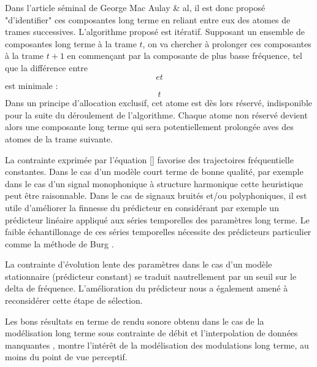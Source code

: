 Dans l'article séminal de George Mac Aulay \& al, il est donc proposé "d'identifier" ces composantes long terme en reliant entre eux des atomes de trames successives. L'algorithme proposé est itératif. Supposant un ensemble de composantes long terme à la trame $t$, on va chercher à prolonger ces composantes à la trame $t+1$ en commençant par la composante de plus basse fréquence, tel que la différence entre $$ et $$ est minimale :
\begin{equation}
t
\end{equation}
Dans un principe d'allocation exclusif, cet atome est dès lors réservé, indisponible pour la suite du déroulement de l'algorithme. Chaque atome non réservé devient alors une composante long terme qui sera potentiellement prolongée aves des atomes de la trame suivante.

La contrainte exprimée par l'équation \ref{} favorise des trajectoires fréquentielle constantes. Dans le cas d'un modèle court terme de bonne qualité, par exemple dans le cas d'un signal monophonique à structure harmonique cette heuristique peut être raisonnable. Dans le cas de signaux bruités et/ou polyphoniques, il est utile d'améliorer la finnesse du prédicteur en considérant par exemple un prédicteur linéaire appliqué aux séries temporelles des paramètres long terme. Le faible échantillonage de ces séries temporelles nécessite des prédicteurs particulier comme la méthode de Burg \cite{}.

La contrainte d'évolution lente des paramètres dans le cas d'un modèle stationnaire (prédicteur constant) se traduit nautrellement par un seuil sur le delta de fréquence. L'amélioration du prédicteur nous a également amené à reconsidérer cette étape de sélection.

Les bons résultats en terme de rendu sonore obtenu dans le cas  de la modélisation long terme sous contrainte de débit \cite{lagrangeTaslp06} et l'interpolation de données manquantes \cite{lagrangeJaes05}, montre l'intérêt de la modélisation des modulations long terme, au moins du point de vue perceptif.

